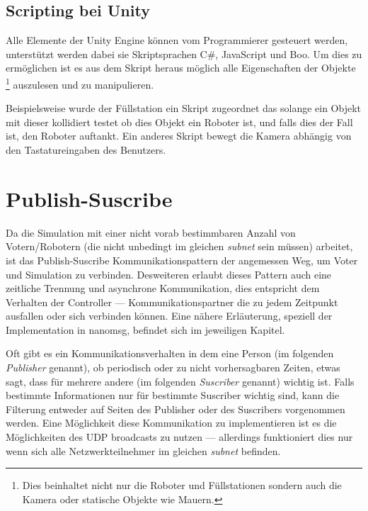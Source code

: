 \subsection{Scripting bei Unity}
Alle Elemente der Unity Engine k{\"{o}}nnen vom Programmierer gesteuert werden, unterst{\"{u}}tzt werden dabei sie Skriptsprachen C\#, JavaScript und Boo.\cite{wiki:unity} Um dies zu erm{\"{o}}glichen ist es aus dem Skript heraus m{\"{o}}glich alle Eigenschaften
der Objekte \footnote{Dies beinhaltet nicht nur die Roboter und F{\"{u}}llstationen sondern auch die Kamera oder statische Objekte wie Mauern.} auszulesen und zu manipulieren.

Beispielsweise wurde der F{\"{u}}llstation ein Skript zugeordnet das solange ein Objekt mit dieser kollidiert testet ob dies Objekt ein Roboter ist, und falls dies der Fall ist,
den Roboter auftankt. Ein anderes Skript bewegt die Kamera abh{\"{a}}ngig von den Tastatureingaben des Benutzers.

\clearpage
\section{Publish-Suscribe}
Da die Simulation mit einer nicht vorab bestimmbaren Anzahl von Votern/Robotern (die nicht unbedingt im gleichen \textit{subnet} sein m{\"{u}}ssen) arbeitet, ist das Publish-Suscribe Kommunikationspattern\cite{pubsub}
der angemessen Weg, um Voter und Simulation zu verbinden.
Desweiteren erlaubt dieses Pattern auch eine zeitliche Trennung und asynchrone Kommunikation, dies entspricht dem Verhalten der Controller --- Kommunikationspartner die zu jedem Zeitpunkt ausfallen oder
sich verbinden k{\"{o}}nnen. Eine n{\"{a}}here Erl{\"{a}}uterung, speziell der Implementation in nanomsg, befindet sich im jeweiligen Kapitel.

Oft gibt es ein Kommunikationsverhalten in dem eine Person (im folgenden \textit{Publisher} genannt), ob periodisch oder zu nicht vorhersagbaren Zeiten, etwas sagt,
dass f{\"{u}}r mehrere andere (im folgenden \textit{Suscriber} genannt) wichtig ist. Falls bestimmte Informationen nur f{\"{u}}r bestimmte Suscriber wichtig sind, kann die Filterung entweder auf Seiten des Publisher oder des Suscribers vorgenommen werden.
Eine M{\"{o}}glichkeit diese Kommunikation zu implementieren ist es die M{\"{o}}glichkeiten des UDP broadcasts zu nutzen --- allerdings funktioniert dies nur wenn sich alle Netzwerkteilnehmer im gleichen
\textit{subnet} befinden.

